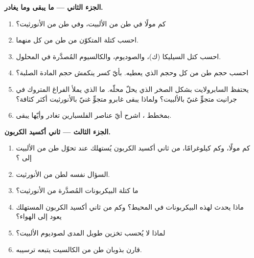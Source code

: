 \begin{problem}
\noindent\textbf{الجزء الثاني --- ما يبقى وما يغادر.}
\begin{enumerate}[resume]
  \item كم مولًا في طن من الألبيت، وفي طن من الأنورثيت؟
  \item احسب كتلة  المتكوّن من طن من كل منهما.
  \item احسب كتل السيليكا (ك)، والصوديوم، والكالسيوم المُصدَّرة في المحلول.
  \item احسب حجم طن من كل  وحجم  الذي يعطيه. بأيّ كسر ينكمش حجم المادة الصلبة؟
  \item يحتفظ السابرولايت بشكل الصخر الذي يحلّ محلّه. ما الذي يملأ الفراغ المتروك في جرانيت متجوٍّ غنيّ بالألبيت؟ ولماذا يبقى غابرو متجوٍّ غنيّ بالأنورثيت أكثر كثافة؟
  \item بمخطط ، اشرح أيّ عناصر الفلسبارين تغادر وأيّها يبقى.
\end{enumerate}

\noindent\textbf{الجزء الثالث --- ثاني أكسيد الكربون.}
\begin{enumerate}[resume]
  \item كم مولًا، وكم كيلوغرامًا، من ثاني أكسيد الكربون يُستهلك عند تحوّل طن من الألبيت إلى ؟
  \item السؤال نفسه لطن من الأنورثيت.
  \item ما كتلة البيكربونات المُصدَّرة من الأنورثيت؟
  \item ماذا يحدث لهذه البيكربونات في المحيط؟ وكم من ثاني أكسيد الكربون المستهلك يعود إلى الهواء؟
  \item لماذا لا يُحسب تخزين طويل المدى لصوديوم الألبيت؟
  \item قارن بذوبان طن من الكالسيت يتبعه ترسيبه.
\end{enumerate}


\end{problem}
